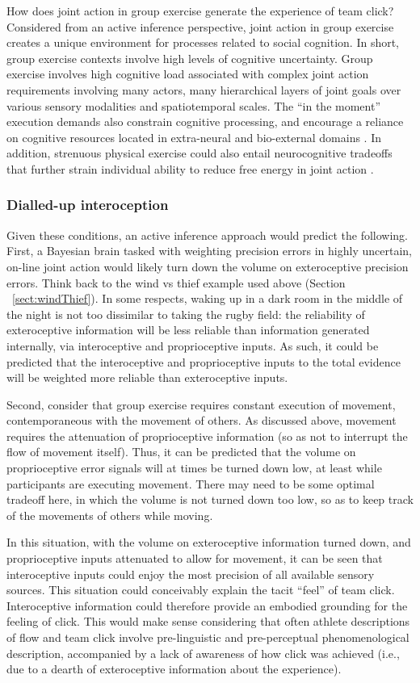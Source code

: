 \begin{CJK}{UTF8}{gbsn}
How does joint action in group exercise generate the experience of team click?  Considered from an active inference perspective, joint action in group exercise creates a unique environment for processes related to social cognition. In short, group exercise contexts involve high levels of cognitive uncertainty.  Group exercise involves high cognitive load associated with complex joint action requirements involving many actors, many hierarchical layers of joint goals over various sensory modalities and spatiotemporal scales. The ``in the moment'' execution demands also constrain cognitive processing, and encourage a reliance on cognitive resources located in extra-neural and bio-external domains \citep{Bourbousson2016}.  In addition, strenuous physical exercise could also entail neurocognitive tradeoffs that further strain individual ability to reduce free energy in joint action \citep{Dietrich2004b}.

\subsubsection{Dialled-up interoception}
Given these conditions, an active inference approach would predict the following.  First, a Bayesian brain tasked with weighting precision errors in highly uncertain, on-line joint action would likely turn down the volume on exteroceptive precision errors.  Think back to the wind vs thief example used above (Section ~\ref{sect:windThief}). In some respects, waking up in a dark room in the middle of the night is not too dissimilar to taking the rugby field: the reliability of exteroceptive information will be less reliable than information generated internally, via interoceptive and proprioceptive inputs. As such, it could be predicted that the interoceptive and proprioceptive inputs to the total evidence will be weighted more reliable than exteroceptive inputs.

Second, consider that group exercise requires constant execution of movement, contemporaneous with the movement of others. As discussed above, movement requires the attenuation of proprioceptive information (so as not to interrupt the flow of movement itself).  Thus, it can be predicted that the volume on proprioceptive error signals will at times be turned down low, at least while participants are executing movement.  There may need to be some optimal tradeoff here, in which the volume is not turned down too low, so as to keep track of the movements of others while moving.

In this situation, with the volume on exteroceptive information turned down, and proprioceptive inputs attenuated to allow for movement, it can be seen that interoceptive inputs could enjoy the most precision of all available sensory sources. This situation could conceivably explain the tacit ``feel'' of team click.  Interoceptive information could therefore provide an embodied grounding for the feeling of click.  This would make sense considering that often athlete descriptions of flow and team click involve pre-linguistic and pre-perceptual phenomenological description, accompanied by a lack of awareness of how click was achieved (i.e., due to a dearth of exteroceptive information about the experience).


\end{CJK}
